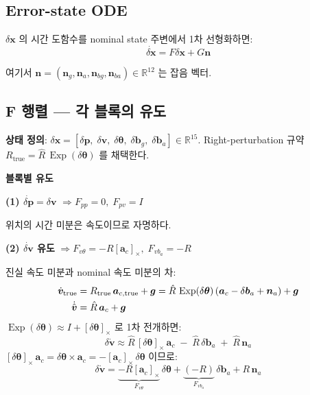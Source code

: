 \documentclass[11pt,a4paper,oneside]{report}
\newcommand{\R}{\mathbb{R}}
\newcommand{\skewop}[1]{[#1]_{\!\times}}
\DeclareMathOperator{\Exp}{Exp}
\begin{document}
\subsection{Error-state ODE}

\(\delta\bm{x}\) 의 시간 도함수를 nominal state 주변에서 1차 선형화하면:
\begin{equation}
\dot{\delta\bm{x}} = F \delta\bm{x} + G \bm{n}
\end{equation}

여기서 \(\bm{n} = (\bm{n}_g, \bm{n}_a, \bm{n}_{bg}, \bm{n}_{ba}) \in \R^{12}\) 는 잡음 벡터.

\subsection{F 행렬 — 각 블록의 유도}

\textbf{상태 정의}: \(\delta\bm{x} = [\delta\bm{p},\; \delta\bm{v},\; \delta\bm{\theta},\; \delta\bm{b}_g,\; \delta\bm{b}_a] \in \R^{15}\).
Right-perturbation 규약 \(R_{\text{true}} = \hat{R}\,\Exp(\delta\bm{\theta})\) 를 채택한다.

\textbf{블록별 유도}

\medskip
\noindent\textbf{(1) \(\dot{\delta\bm{p}} = \delta\bm{v}\)} \hfill \(\Rightarrow F_{pp}=0,\; F_{pv}=I\)

위치의 시간 미분은 속도이므로 자명하다.

\medskip
\noindent\textbf{(2) \(\dot{\delta\bm{v}}\) 유도} \hfill \(\Rightarrow F_{v\theta}=-R\skewop{\bm{a}_c},\; F_{vb_a}=-R\)

진실 속도 미분과 nominal 속도 미분의 차:
\begin{align}
\dot{\bm{v}}_{\text{true}} &= R_{\text{true}}\,\bm{a}_{c,\text{true}} + \bm{g}
  = \hat{R}\,\Exp(\delta\bm{\theta})\,(\bm{a}_c - \delta\bm{b}_a + \bm{n}_a) + \bm{g} \notag\\
\dot{\hat{\bm{v}}} &= \hat{R}\,\bm{a}_c + \bm{g} \notag
\end{align}
\(\Exp(\delta\bm{\theta}) \approx I + \skewop{\delta\bm{\theta}}\) 로 1차 전개하면:
\begin{equation}
\delta\dot{\bm{v}} \approx \hat{R}\,\skewop{\delta\bm{\theta}}\,\bm{a}_c \;-\; \hat{R}\,\delta\bm{b}_a \;+\; \hat{R}\,\bm{n}_a
\end{equation}
\(\skewop{\delta\bm{\theta}}\,\bm{a}_c = \delta\bm{\theta} \times \bm{a}_c = -\skewop{\bm{a}_c}\,\delta\bm{\theta}\) 이므로:
\begin{equation}
\delta\dot{\bm{v}} = \underbrace{-R\skewop{\bm{a}_c}}_{F_{v\theta}}\,\delta\bm{\theta}
                  + \underbrace{(-R)}_{F_{vb_a}}\,\delta\bm{b}_a
                  + R\,\bm{n}_a
\end{equation}
\end{document}
